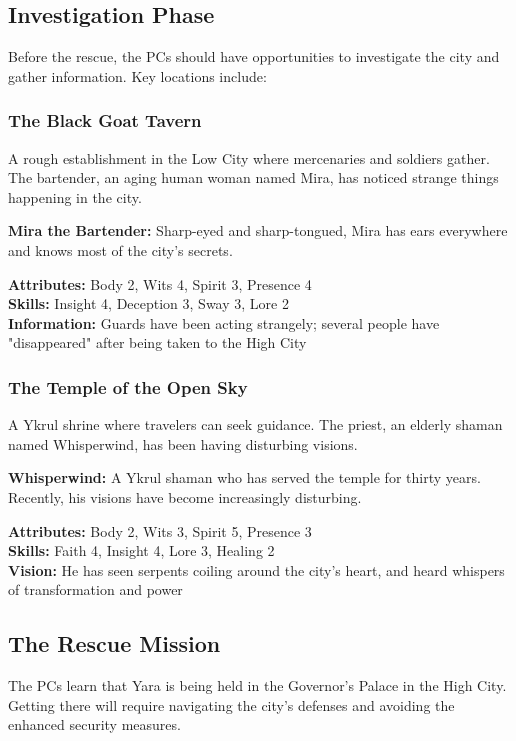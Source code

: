 \documentclass[12pt,twoside]{article}
\begin{document}
\subsection{Investigation Phase}

Before the rescue, the PCs should have opportunities to investigate the city and gather information. Key locations include:

\subsubsection{The Black Goat Tavern}

A rough establishment in the Low City where mercenaries and soldiers gather. The bartender, an aging human woman named Mira, has noticed strange things happening in the city.

\textbf{Mira the Bartender:}
Sharp-eyed and sharp-tongued, Mira has ears everywhere and knows most of the city's secrets.

\textbf{Attributes:} Body 2, Wits 4, Spirit 3, Presence 4 \\
\textbf{Skills:} Insight 4, Deception 3, Sway 3, Lore 2 \\
\textbf{Information:} Guards have been acting strangely; several people have "disappeared" after being taken to the High City

\subsubsection{The Temple of the Open Sky}

A Ykrul shrine where travelers can seek guidance. The priest, an elderly shaman named Whisperwind, has been having disturbing visions.

\textbf{Whisperwind:}
A Ykrul shaman who has served the temple for thirty years. Recently, his visions have become increasingly disturbing.

\textbf{Attributes:} Body 2, Wits 3, Spirit 5, Presence 3 \\
\textbf{Skills:} Faith 4, Insight 4, Lore 3, Healing 2 \\
\textbf{Vision:} He has seen serpents coiling around the city's heart, and heard whispers of transformation and power

\subsection{The Rescue Mission}

The PCs learn that Yara is being held in the Governor's Palace in the High City. Getting there will require navigating the city's defenses and avoiding the enhanced security measures.
\end{document}

